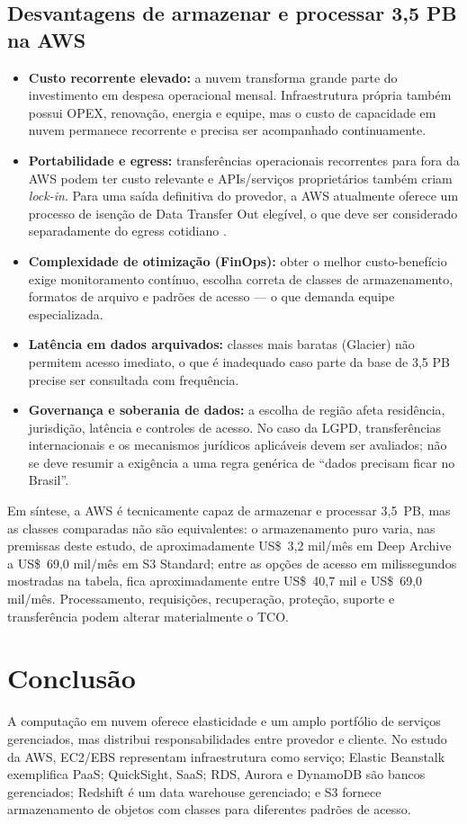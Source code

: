 \documentclass[11pt,a4paper]{article}
\begin{document}
\subsection{Desvantagens de armazenar e processar 3,5 PB na AWS}
\begin{itemize}[leftmargin=*]
    \item \textbf{Custo recorrente elevado:} a nuvem transforma grande parte do investimento em despesa operacional mensal. Infraestrutura própria também possui OPEX, renovação, energia e equipe, mas o custo de capacidade em nuvem permanece recorrente e precisa ser acompanhado continuamente.
    \item \textbf{Portabilidade e egress:} transferências operacionais recorrentes para fora da AWS podem ter custo relevante e APIs/serviços proprietários também criam \emph{lock-in}. Para uma saída definitiva do provedor, a AWS atualmente oferece um processo de isenção de Data Transfer Out elegível, o que deve ser considerado separadamente do egress cotidiano \cite{s3freeegress}.
    \item \textbf{Complexidade de otimização (FinOps):} obter o melhor custo-benefício exige monitoramento contínuo, escolha correta de classes de armazenamento, formatos de arquivo e padrões de acesso --- o que demanda equipe especializada.
    \item \textbf{Latência em dados arquivados:} classes mais baratas (Glacier) não permitem acesso imediato, o que é inadequado caso parte da base de 3,5 PB precise ser consultada com frequência.
    \item \textbf{Governança e soberania de dados:} a escolha de região afeta residência, jurisdição, latência e controles de acesso. No caso da LGPD, transferências internacionais e os mecanismos jurídicos aplicáveis devem ser avaliados; não se deve resumir a exigência a uma regra genérica de ``dados precisam ficar no Brasil''.
\end{itemize}

Em síntese, a AWS é tecnicamente capaz de armazenar e processar 3,5~PB, mas as classes comparadas não são equivalentes: o armazenamento puro varia, nas premissas deste estudo, de aproximadamente US\$~3,2 mil/mês em Deep Archive a US\$~69,0 mil/mês em S3 Standard; entre as opções de acesso em milissegundos mostradas na tabela, fica aproximadamente entre US\$~40,7 mil e US\$~69,0 mil/mês. Processamento, requisições, recuperação, proteção, suporte e transferência podem alterar materialmente o TCO.

\clearpage
\section{Conclusão}
A computação em nuvem oferece elasticidade e um amplo portfólio de serviços gerenciados, mas distribui responsabilidades entre provedor e cliente. No estudo da AWS, EC2/EBS representam infraestrutura como serviço; Elastic Beanstalk exemplifica PaaS; QuickSight, SaaS; RDS, Aurora e DynamoDB são bancos gerenciados; Redshift é um data warehouse gerenciado; e S3 fornece armazenamento de objetos com classes para diferentes padrões de acesso.
\end{document}
